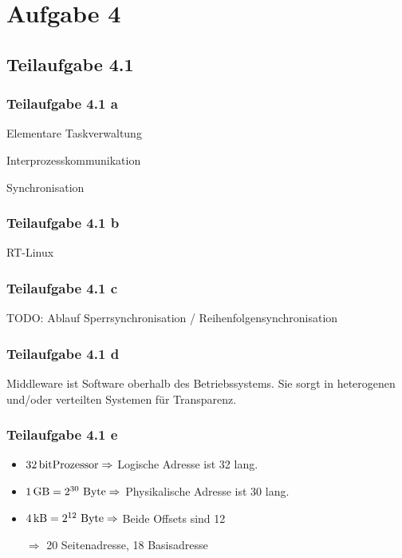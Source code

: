\documentclass[a4paper]{scrartcl}
\begin{document}
  \section*{Aufgabe 4}
  \subsection*{Teilaufgabe 4.1}
  \subsubsection*{Teilaufgabe 4.1 a}
  \begin{enumerate*}[label=(\arabic*)]
      \item Elementare Taskverwaltung
      \item Interprozesskommunikation
      \item Synchronisation
  \end{enumerate*}

  \subsubsection*{Teilaufgabe 4.1 b}
  RT-Linux 

  \subsubsection*{Teilaufgabe 4.1 c}
  TODO: Ablauf Sperrsynchronisation / Reihenfolgensynchronisation

  \subsubsection*{Teilaufgabe 4.1 d}
  Middleware ist Software oberhalb des Betriebssystems. Sie sorgt in
  heterogenen und/oder verteilten Systemen für Transparenz.

  \subsubsection*{Teilaufgabe 4.1 e}
  \begin{itemize}
      \item $\SI{32}{\bit}\text{Prozessor} \Rightarrow$ Logische
            Adresse ist \SI{32}{\bit} lang.
      \item $\SI{1}{\giga\byte}=2^{30}\text{ Byte} \Rightarrow$ Physikalische
            Adresse ist \SI{30}{\bit} lang.
      \item $\SI{4}{\kilo\byte}=2^{12}\text{ Byte} \Rightarrow$ Beide Offsets
            sind \SI{12}{\bit}
      \item[$\Rightarrow$] \SI{20}{\bit} Seitenadresse, \SI{18}{\bit} Basisadresse
  \end{itemize}
\end{document}

